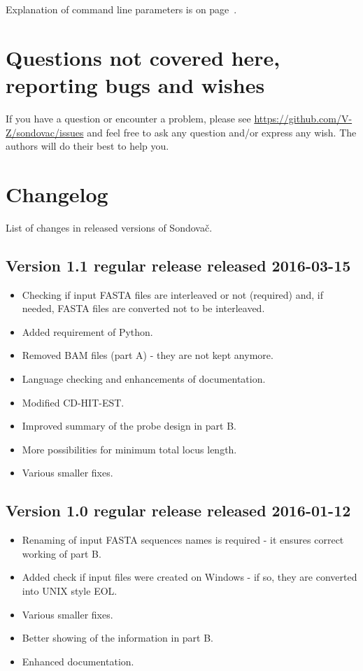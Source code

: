 \documentclass[a4paper, 11pt, twoside]{article}
\begin{document}
Explanation of command line parameters is on page~\pageref{script-usage}.

\section{Questions not covered here, reporting bugs and wishes}

If you have a question or encounter a problem, please see \url{https://github.com/V-Z/sondovac/issues} and feel free to ask any question and/or express any wish. The authors will do their best to help you.

\section{Changelog} %

List of changes in released versions of Sondovač.

\subsection{Version 1.1 regular release released 2016-03-15}

\begin{itemize}
  \item Checking if input FASTA files are interleaved or not (required) and, if needed, FASTA files are converted not to be interleaved.
  \item Added requirement of Python.
  \item Removed BAM files (part A) - they are not kept anymore.
  \item Language checking and enhancements of documentation.
  \item Modified CD-HIT-EST.
  \item Improved summary of the probe design in part B.
  \item More possibilities for minimum total locus length.
  \item Various smaller fixes.
\end{itemize}

\subsection{Version 1.0 regular release released 2016-01-12}

\begin{itemize}
  \item Renaming of input FASTA sequences names is required - it ensures correct working of part B.
  \item Added check if input files were created on Windows - if so, they are converted into UNIX style EOL.
  \item Various smaller fixes.
  \item Better showing of the information in part B.
  \item Enhanced documentation.
\end{itemize}
\end{document}
